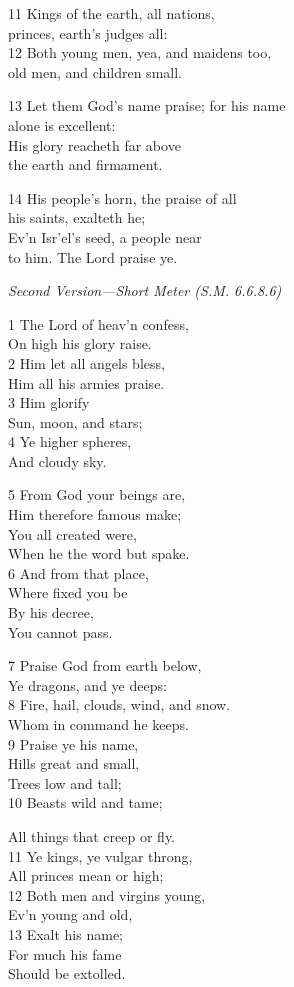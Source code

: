 11 Kings of the earth, all nations,\\
princes, earth’s judges all:\\
12 Both young men, yea, and maidens too,\\
old men, and children small.

13 Let them God’s name praise; for his name\\
alone is excellent:\\
His glory reacheth far above\\
the earth and firmament.

14 His people’s horn, the praise of all\\
his saints, exalteth he;\\
Ev’n Isr’el’s seed, a people near\\
to him. The Lord praise ye.

\emph{Second Version---Short Meter (S.M. 6.6.8.6)}

1 The Lord of heav’n confess,\\
On high his glory raise.\\
2 Him let all angels bless,\\
Him all his armies praise.\\
3 Him glorify\\
Sun, moon, and stars;\\
4 Ye higher spheres,\\
And cloudy sky.

5 From God your beings are,\\
Him therefore famous make;\\
You all created were,\\
When he the word but spake.\\
6 And from that place,\\
Where fixed you be\\
By his decree,\\
You cannot pass.

7 Praise God from earth below,\\
Ye dragons, and ye deeps:\\
8 Fire, hail, clouds, wind, and snow.\\
Whom in command he keeps.\\
9 Praise ye his name,\\
Hills great and small,\\
Trees low and tall;\\
10 Beasts wild and tame;

All things that creep or fly.\\
11 Ye kings, ye vulgar throng,\\
All princes mean or high;\\
12 Both men and virgins young,\\
Ev’n young and old,\\
13 Exalt his name;\\
For much his fame\\
Should be extolled.

